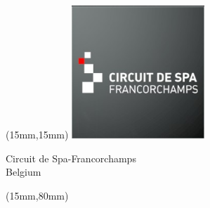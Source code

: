 \begin{textblock*}{50mm}(15mm,15mm)%
\includegraphics[width=50mm]{LG/2015-05-20_00079.png}
\par Circuit de Spa-Francorchamps\\ Belgium
\end{textblock*}
\begin{textblock*}{185mm}(15mm,80mm)%
\end{textblock*}
